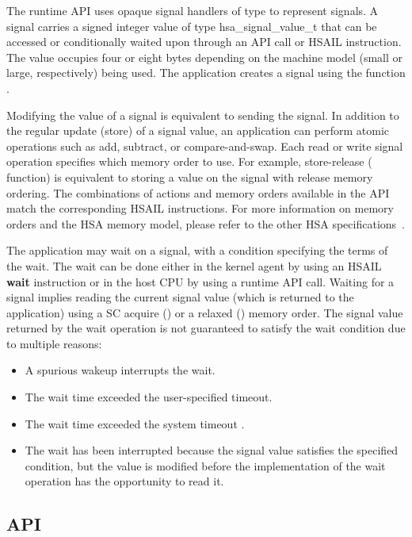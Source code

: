 \documentclass[oneside]{book}
\newcommand{\reffun}[1]{\textbf{#1}}
\newcommand{\reftyp}[1]{#1}
\newcommand{\refhsl}[1]{\reffun{#1}}
\begin{document}
The runtime API uses opaque signal handlers of type  to
represent signals. A signal carries a signed integer value of type
\reftyp{hsa_signal_value_t} that can be accessed or conditionally waited upon
through an API call or HSAIL instruction. The value occupies four or eight bytes
depending on the machine model (small or large, respectively) being used. The
application creates a signal using the function .

Modifying the value of a signal is equivalent to sending the signal. In addition
to the regular update (store) of a signal value, an application can perform
atomic operations such as add, subtract, or compare-and-swap. Each read or write
signal operation specifies which memory order to use. For example, store-release
( function) is equivalent to storing a value on
the signal with release memory ordering. The combinations of actions and
memory orders available in the API match the corresponding HSAIL
instructions. For more information on memory orders and the HSA memory model,
please refer to the other HSA specifications~\cite{prm, sar}.

The application may wait on a signal, with a condition specifying the terms of
the wait. The wait can be done either in the kernel agent by using an HSAIL
\refhsl{wait} instruction or in the host CPU by using a runtime API
call. Waiting for a signal implies reading the current signal value (which is
returned to the application) using a SC acquire
() or a relaxed
() memory order. The signal value returned by
the wait operation is not guaranteed to satisfy the wait condition due to
multiple reasons:
\begin{itemize}[itemsep=1pt,topsep=3pt,partopsep=0pt]
\item A spurious wakeup interrupts the wait.
\item The wait time exceeded the user-specified timeout.
\item The wait time exceeded the system timeout
  .
\item The wait has been interrupted because the signal value satisfies the
  specified condition, but the value is modified before the implementation of
  the wait operation has the opportunity to read it.
\end{itemize}


\subsection{API}
\end{document}
